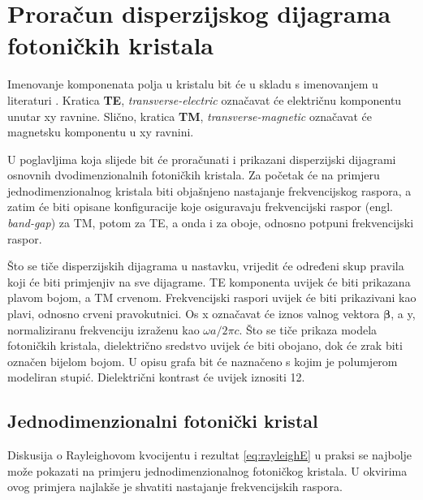 \documentclass[utf8, seminar]{fer}
\begin{document}
\chapter{Proračun disperzijskog dijagrama fotoničkih kristala}

Imenovanje komponenata polja u kristalu bit će u skladu s imenovanjem u
literaturi \cite{joannopoulos2011photonic}. Kratica \textbf{TE},
\textit{transverse-electric} označavat će električnu komponentu unutar xy ravnine.
Slično, kratica \textbf{TM}, \textit{transverse-magnetic} označavat će magnetsku
komponentu u xy ravnini.

U poglavljima koja slijede bit će proračunati i prikazani disperzijski dijagrami
osnovnih dvodimenzionalnih fotoničkih kristala. Za početak će na primjeru
jednodimenzionalnog kristala biti objašnjeno nastajanje frekvencijskog raspora, a
zatim će biti opisane konfiguracije koje osiguravaju frekvencijski raspor (engl.
\textit{band-gap}) za TM, potom za TE, a onda i za oboje, odnosno potpuni
frekvencijski raspor.

Što se tiče disperzijskih dijagrama u nastavku, vrijedit će određeni skup pravila
koji će biti primjenjiv na sve dijagrame. TE komponenta uvijek će biti prikazana
plavom bojom, a TM crvenom. Frekvencijski raspori uvijek će biti prikazivani kao
plavi, odnosno crveni pravokutnici. Os x označavat će iznos valnog vektora
$\mathbf{\beta}$, a y, normaliziranu frekvenciju izraženu kao
${\omega a/ 2 \pi c}$. Što se tiče prikaza modela fotoničkih kristala,
dielektrično sredstvo uvijek će biti obojano, dok će zrak biti označen bijelom
bojom. U opisu grafa bit će naznačeno s kojim je polumjerom modeliran stupić.
Dielektrični kontrast će uvijek iznositi 12.

\newpage

\section{Jednodimenzionalni fotonički kristal}

Diskusija o Rayleighovom kvocijentu i rezultat \ref{eq:rayleighE} u praksi se
najbolje može pokazati na primjeru jednodimenzionalnog fotoničkog kristala.
U okvirima ovog primjera najlakše je shvatiti nastajanje frekvencijskih raspora.
\end{document}
